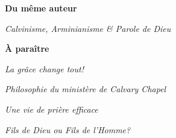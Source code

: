 \newpage
\mbox{}
\vfill
{\small
\begin{center}
{\bfseries Du même auteur}

\textit{Calvinisme, Arminianisme \& Parole de Dieu}

\end{center}

\begin{center}
{\bfseries À paraître}

\textit{La grâce change tout!}

\textit{Philosophie du ministère de Calvary Chapel}

\textit{Une vie de prière efficace}

\textit{Fils de Dieu ou Fils de l'Homme?}
\end{center}
}
\vfill
\mbox{}
\vfill
\mbox{}
\thispagestyle{empty}
\pagebreak

